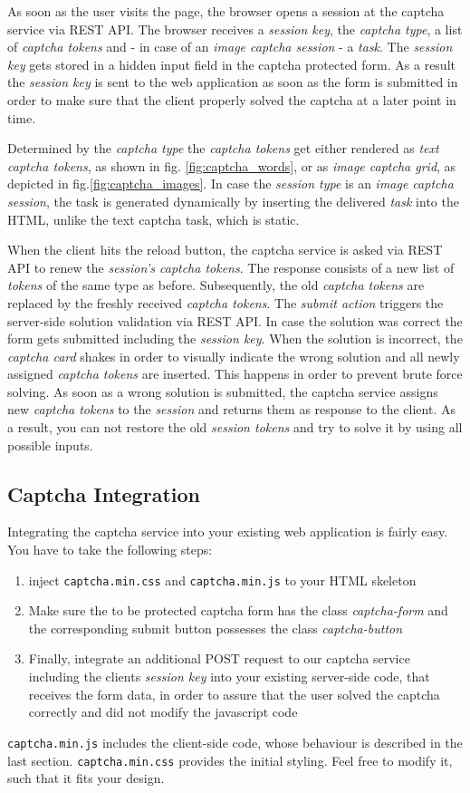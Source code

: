  As soon as the user visits the page, the browser opens a session at the captcha service via REST API. The browser receives a \textit{session key}, the \textit{captcha type}, a list of \textit{captcha tokens} and - in case of an \textit{image captcha session} - a \textit{task}. The \textit{session key} gets stored in a hidden input field in the captcha protected form. As a result the \textit{session key} is sent to the web application as soon as the form is submitted in order to make sure that the client properly solved the captcha at a later point in time. 
 
 Determined by the \textit{captcha type} the \textit{captcha tokens} get either rendered as \textit{text captcha tokens}, as shown in fig. \ref{fig:captcha_words}, or as \textit{image captcha grid}, as depicted in fig.\ref{fig:captcha_images}. In case the \textit{session type} is an \textit{image captcha session}, the task is generated dynamically by inserting the delivered \textit{task} into the HTML, unlike the text captcha task, which is static.
 
 When the client hits the reload button, the captcha service is asked via REST API to renew the \textit{session's captcha tokens}. The response consists of a new list of \textit{tokens} of the same type as before. Subsequently, the old \textit{captcha tokens} are replaced by the freshly received \textit{captcha tokens}. The \textit{submit action} triggers the server-side solution validation via REST API. In case the solution was correct the form gets submitted including the \textit{session key}. When the solution is incorrect, the \textit{captcha card} shakes in order to visually indicate the wrong solution and all newly assigned \textit{captcha tokens} are inserted. This happens in order to prevent brute force solving. As soon as a wrong solution is submitted, the captcha service assigns new \textit{captcha tokens} to the \textit{session} and returns them as response to the client. As a result, you can not restore the old \textit{session tokens} and try to solve it by using all possible inputs.

\subsection{Captcha Integration}
\label{subsec:Captcha Integration}

Integrating the captcha service into your existing web application is fairly easy. You have to take the following steps:
\begin{enumerate}
	\item inject \texttt{captcha.min.css} and \texttt{captcha.min.js} to your HTML skeleton
	\item  Make sure the to be protected captcha form has the class \textit{captcha-form} and the corresponding submit button possesses the class \textit{captcha-button}
	\item Finally, integrate an additional POST request to our captcha service including the clients \textit{session key} into your existing server-side code, that receives the form data, in order to assure that the user solved the captcha correctly and did not modify the javascript code
\end{enumerate}

\texttt{captcha.min.js} includes the client-side code, whose behaviour is described in the last section. \texttt{captcha.min.css} provides the initial styling. Feel free to modify it, such that it fits your design. 

\clearpage
